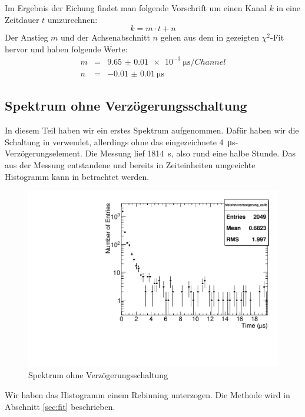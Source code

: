 Im Ergebnis der Eichung findet man folgende Vorschrift um einen Kanal $k$ in
eine Zeitdauer $t$ umzurechnen:
\begin{equation}
  k = m \cdot t + n
\end{equation}
Der Anstieg $m$ und der Achsenabschnitt $n$ gehen aus dem in 
gezeigten $\chi^2$-Fit hervor und haben folgende Werte:
\begin{eqnarray}
  m &=& \SI{9.65(1)e-3}{\micro\second\per{Channel}} \\
  n &=& \SI{-0.01(1)}{\micro\second}
\end{eqnarray}

\subsection{Spektrum ohne Verzögerungsschaltung}

In diesem Teil haben wir ein erstes Spektrum aufgenommen. Dafür haben wir die
Schaltung in  verwendet, allerdings ohne das
eingezeichnete \SI{4}{\micro\second}-Verzögerungselement. Die Messung lief
\SI{1814}{\second}, also rund eine halbe Stunde. Das aus der Messung
entstandene und bereits in Zeiteinheiten umgeeichte Histogramm kann in
 betrachtet werden.

\begin{figure}[ht!]
  \centering
  \includegraphics[width=\columnwidth,keepaspectratio=true]{eichhistohneverzoegerung_calib}
  \caption{Spektrum ohne Verzögerungsschaltung}
  \label{fig:ohne_verzoegerung}
\end{figure}

Wir haben das Histogramm einem Rebinning unterzogen. Die Methode wird in
Abschnitt \ref{sec:fit} beschrieben.

